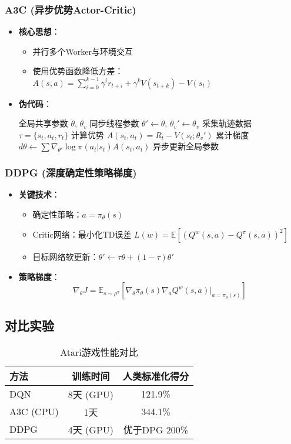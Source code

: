 \subsubsection{A3C (异步优势Actor-Critic)}
\begin{itemize}
    \item \textbf{核心思想}：
    \begin{itemize}
        \item 并行多个Worker与环境交互
        \item 使用优势函数降低方差：$A(s,a) = \sum_{i=0}^{k-1} \gamma^i r_{t+i} + \gamma^k V(s_{t+k}) - V(s_t)$
    \end{itemize}
    \item \textbf{伪代码}：
    \begin{algorithmic}[1]
        \STATE 全局共享参数 $\theta$, $\theta_v$
        \STATE 同步线程参数 $\theta' \gets \theta$, $\theta_v' \gets \theta_v$
        \STATE 采集轨迹数据 $\tau = \{s_t,a_t,r_t\}$
        \STATE 计算优势 $A(s_t,a_t) = R_t - V(s_t;\theta_v')$
        \STATE 累计梯度 $d\theta \gets \sum \nabla_{\theta'} \log \pi(a_t|s_t)A(s_t,a_t)$
        \STATE 异步更新全局参数
        \ENDFOR
    \end{algorithmic}
\end{itemize}

\subsubsection{DDPG (深度确定性策略梯度)}
\begin{itemize}
    \item \textbf{关键技术}：
    \begin{itemize}
        \item 确定性策略：$a = \pi_\theta(s)$
        \item Critic网络：最小化TD误差 $L(w) = \mathbb{E}[(Q^w(s,a) - Q^\pi(s,a))^2]$
        \item 目标网络软更新：$\theta' \gets \tau \theta + (1-\tau)\theta'$
    \end{itemize}
    \item \textbf{策略梯度}：
    \[
    \nabla_\theta J = \mathbb{E}_{s\sim \rho^\pi}[\nabla_\theta \pi_\theta(s) \nabla_a Q^w(s,a)|_{a=\pi_\theta(s)}]
    \]
\end{itemize}

\subsection{对比实验}
\begin{table}[H] %
\centering
\caption{Atari游戏性能对比}
\begin{tabular}{lcc}
\toprule
方法 & 训练时间 & 人类标准化得分 \\ 
\midrule
DQN & 8天 (GPU) & 121.9\% \\
A3C (CPU) & 1天 & 344.1\% \\
DDPG & 4天 (GPU) & 优于DPG 200\% \\
\bottomrule
\end{tabular}
\end{table}

